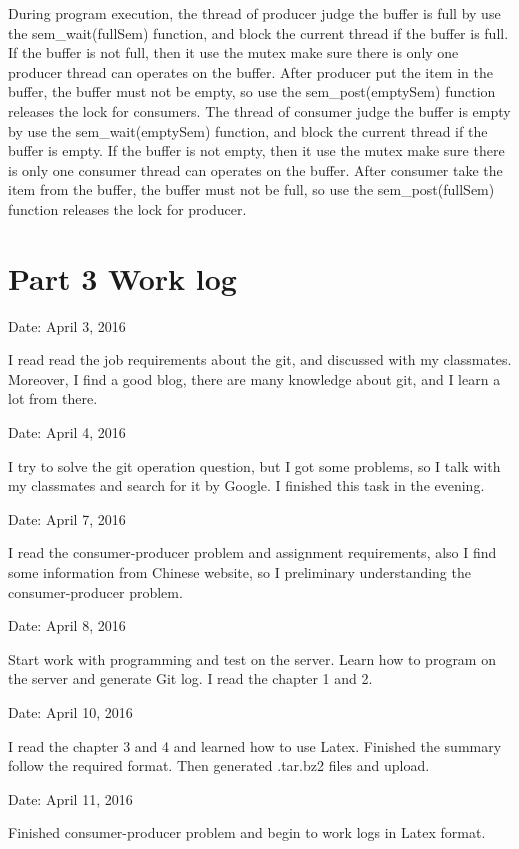 \documentclass[10pt,draftclsnofoot,peerreview,letterpaper,onecolumn,]{IEEEtran}
\begin{document}
During program execution, the thread of producer judge the buffer is full by use the sem\_wait(fullSem) function, and block the current thread if the buffer is full. If the buffer is not full, then it use the mutex make sure there is only one producer thread can operates on the buffer. After producer put the item in the buffer, the buffer must not be empty, so use the sem\_post(emptySem) function releases the lock for consumers. The thread of consumer judge the buffer is empty by use the sem\_wait(emptySem) function, and block the current thread if the buffer is empty. If the buffer is not empty, then it use the mutex make sure there is only one consumer thread can operates on the buffer. After consumer take the item from the buffer, the buffer must not be full, so use the sem\_post(fullSem) function releases the lock for producer.


\newpage
\section{Part 3 Work log}

Date: April 3, 2016

I read read the job requirements about the git, and discussed with my classmates. Moreover, I find a good blog, there are many knowledge about git, and I learn a lot from there.

Date: April 4, 2016

I try to solve the git operation question, but I got some problems, so I talk with my classmates and search for it by Google. I finished this task in the evening.

Date: April 7, 2016

I read the consumer-producer problem and assignment requirements, also I find some information from Chinese website, so I preliminary understanding the consumer-producer problem.

Date: April 8, 2016

Start work with programming and test on the server. Learn how to program on the server and generate Git log. I read the chapter 1 and 2.

Date: April 10, 2016

I read the chapter 3 and 4 and learned how to use Latex. Finished the summary follow the required format. Then generated .tar.bz2 files and upload.

Date: April 11, 2016

Finished consumer-producer problem and begin to work logs in Latex format.
\end{document}
